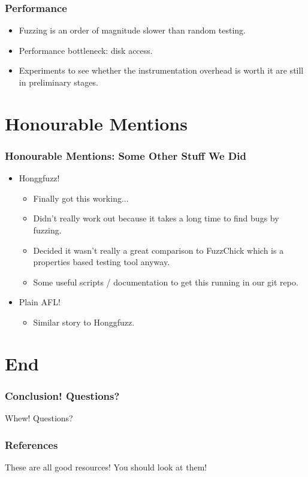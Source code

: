 \documentclass{beamer}
\begin{document}
\begin{frame}
  \frametitle{Performance}
  \begin{itemize}
  \item Fuzzing is an order of magnitude slower than random testing.
  \item Performance bottleneck: disk access.
  \item Experiments to see whether the instrumentation overhead is worth it are
    still in preliminary stages.
  \end{itemize}
\end{frame}

\section{Honourable Mentions}

\begin{frame}
  \frametitle{Honourable Mentions: Some Other Stuff We Did}

  \begin{itemize}
    \pause
  \item Honggfuzz!
    \pause
    \begin{itemize}
    \item Finally got this working...
    \item Didn't really work out because it takes a long time to find
      bugs by fuzzing.
    \item Decided it wasn't really a great comparison to FuzzChick
      which is a properties based testing tool anyway.
    \item Some useful scripts / documentation to get this running in
      our git repo. \cite{quick700}
    \end{itemize}
    \pause
  \item Plain AFL!
    \pause
    \begin{itemize}
    \item Similar story to Honggfuzz.
    \end{itemize}
  \end{itemize}
\end{frame}

\section{End}

\begin{frame}
  \frametitle{Conclusion! Questions?}

  \huge{Whew! Questions?}
\end{frame}

\begin{frame}
  \frametitle{References}

  \nocite{*}
  \printbibliography

  These are all good resources! You should look at them!
\end{frame}
\end{document}
